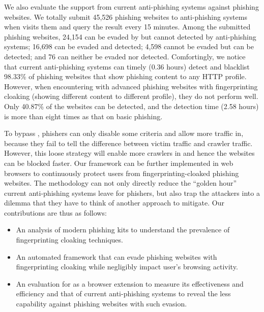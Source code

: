 We also evaluate the support from current anti-phishing systems against phishing websites.
We totally submit 45,526 phishing websites to anti-phishing systems when \spartacus visits them and query the result every 15 minutes.
Among the submitted phishing websites, 24,154 can be evaded by \spartacus but cannot detected by anti-phishing systems;
16,698 can be evaded and detected;
4,598 cannot be evaded but can be detected;
and 76 can neither be evaded nor detected.
Comfortingly, we notice that current anti-phishing systems can timely (0.36 hours) detect and blacklist 98.33\% of phishing websites that show phishing content to any HTTP profile.
However, when encountering with advanced phishing websites with fingerprinting cloaking (showing different content to different profile), they do not perform well.
Only 40.87\% of the websites can be detected, and the detection time (2.58 hours) is more than eight times as that on basic phishing.

To bypass \spartacus, phishers can only disable some criteria and allow more traffic in, because they fail to tell the difference between victim traffic and crawler traffic.
However, this loose strategy will enable more crawlers in and hence the websites can be blocked faster.
Our \spartacus framework can be further implemented in web browsers to continuously protect users from fingerprinting-cloaked phishing websites.
The methodology can not only directly reduce the ``golden hour'' current anti-phishing systems leave for phishers,
but also trap the attackers into a dilemma that they have to think of another approach to mitigate.
Our contributions are thus as follows:

\begin{itemize}
    \item An analysis of modern phishing kits to understand the prevalence of fingerprinting cloaking techniques.
    \item An automated framework that can evade phishing websites with fingerprinting cloaking while negligibly impact user's browsing activity.
    \item An evaluation for \spartacus as a browser extension to measure its effectiveness and efficiency and that of current anti-phishing systems to reveal the less capability against phishing websites with such evasion.
\end{itemize}
